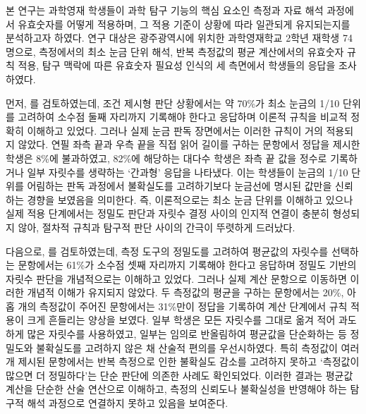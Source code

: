 본 연구는 과학영재 학생들이 과학 탐구 기능의 핵심 요소인 측정과 자료 해석 과정에서
유효숫자를 어떻게 적용하며, 그 적용 기준이 상황에 따라 일관되게 유지되는지를 분석하고자 하였다.
%
연구 대상은 광주광역시에 위치한 과학영재학교 2학년 재학생 74명으로,
%
측정에서의 최소 눈금 단위 해석, 반복 측정값의 평균 계산에서의 유효숫자 규칙 적용,
탐구 맥락에 따른 유효숫자 필요성 인식의 세 측면에서 학생들의 응답을 조사하였다.

먼저, 를 검토하였는데,
%
조건 제시형 판단 상황에서는 약 70\%가 최소 눈금의 1/10 단위를 고려하여
소수점 둘째 자리까지 기록해야 한다고 응답하며 이론적 규칙을 비교적 정확히 이해하고 있었다.
%
그러나 실제 눈금 판독 장면에서는 이러한 규칙이 거의 적용되지 않았다.
연필 좌측 끝과 우측 끝을 직접 읽어 길이를 구하는 문항에서 정답을 제시한 학생은
8\%에 불과하였고, 82\%에 해당하는 대다수 학생은 좌측 끝 값을 정수로 기록하거나 일부 자릿수를
생략하는 `간과형' 응답을 나타냈다.
%
이는 학생들이 눈금의 1/10 단위를 어림하는 판독 과정에서 불확실도를 고려하기보다
눈금선에 명시된 값만을 신뢰하는 경향을 보였음을 의미한다.
%
즉, 이론적으로는 최소 눈금 단위를 이해하고 있으나 실제 적용 단계에서는
정밀도 판단과 자릿수 결정 사이의 인지적 연결이 충분히 형성되지 않아,
절차적 규칙과 탐구적 판단 사이의 간극이 뚜렷하게 드러났다.


다음으로, 를 검토하였는데,
%
측정 도구의 정밀도를 고려하여 평균값의 자릿수를 선택하는 문항에서는 61\%가 소수점 셋째 자리까지
기록해야 한다고 응답하며 정밀도 기반의 자릿수 판단을 개념적으로는 이해하고 있었다.
그러나 실제 계산 문항으로 이동하면 이러한 개념적 이해가 유지되지 않았다.
두 측정값의 평균을 구하는 문항에서는 20\%, 아홉 개의 측정값이 주어진 문항에서는 31\%만이
정답을 기록하여 계산 단계에서 규칙 적용이 크게 흔들리는 양상을 보였다.
일부 학생은 모든 자릿수를 그대로 옮겨 적어 과도하게 많은 자릿수를 사용하였고,
일부는 임의로 반올림하여 평균값을 단순화하는 등 정밀도와 불확실도를 고려하지 않은 채
산술적 편의를 우선시하였다.
%
특히 측정값이 여러 개 제시된 문항에서는 반복 측정으로 인한 불확실도 감소를 고려하지 못하고
`측정값이 많으면 더 정밀하다'는 단순 판단에 의존한 사례도 확인되었다.
%
이러한 결과는 평균값 계산을 단순한 산술 연산으로 이해하고, 측정의 신뢰도나 불확실성을
반영해야 하는 탐구적 해석 과정으로 연결하지 못하고 있음을 보여준다.

